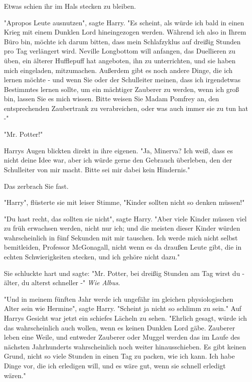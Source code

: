 {Etwas schien ihr im Hals stecken zu bleiben.

"Apropos Leute ausnutzen", sagte Harry. "Es scheint, als würde ich bald in einen Krieg mit einem Dunklen Lord hineingezogen werden. Während ich also in Ihrem Büro bin, möchte ich darum bitten, dass mein Schlafzyklus auf dreißig Stunden pro Tag verlängert wird. Neville Longbottom will anfangen, das Duellieren zu üben, ein älterer Hufflepuff hat angeboten, ihn zu unterrichten, und sie haben mich eingeladen, mitzumachen. Außerdem gibt es noch andere Dinge, die ich lernen möchte - und wenn Sie oder der Schulleiter meinen, dass ich irgendetwas Bestimmtes lernen sollte, um ein mächtiger Zauberer zu werden, wenn ich groß bin, lassen Sie es mich wissen. Bitte weisen Sie Madam Pomfrey an, den entsprechenden Zaubertrank zu verabreichen, oder was auch immer sie zu tun hat -"

"Mr. Potter!"

Harrys Augen blickten direkt in ihre eigenen. "Ja, Minerva? Ich weiß, dass es nicht deine Idee war, aber ich würde gerne den Gebrauch überleben, den der Schulleiter von mir macht. Bitte sei mir dabei kein Hindernis."

Das zerbrach Sie fast.

"Harry", flüsterte sie mit leiser Stimme, "Kinder sollten nicht so denken müssen!"

"Du hast recht, das sollten sie nicht", sagte Harry. "Aber viele Kinder müssen viel zu früh erwachsen werden, nicht nur ich; und die meisten dieser Kinder würden wahrscheinlich in fünf Sekunden mit mir tauschen. Ich werde mich nicht selbst bemitleiden, Professor McGonagall, nicht wenn es da draußen Leute gibt, die in echten Schwierigkeiten stecken, und ich gehöre nicht dazu."

Sie schluckte hart und sagte: "Mr. Potter, bei dreißig Stunden am Tag wirst du - älter, du alterst schneller -" \emph{Wie Albus}.

"Und in meinem fünften Jahr werde ich ungefähr im gleichen physiologischen Alter sein wie Hermine", sagte Harry. "Scheint ja nicht so schlimm zu sein." Auf Harrys Gesicht war jetzt ein schiefes Lächeln zu sehen. "Ehrlich gesagt, würde ich das wahrscheinlich auch wollen, wenn es keinen Dunklen Lord gäbe. Zauberer leben eine Weile, und entweder Zauberer oder Muggel werden das im Laufe des nächsten Jahrhunderts wahrscheinlich noch weiter hinausschieben. Es gibt keinen Grund, nicht so viele Stunden in einen Tag zu packen, wie ich kann. Ich habe Dinge vor, die ich erledigen will, und es wäre gut, wenn sie schnell erledigt wären."

}

